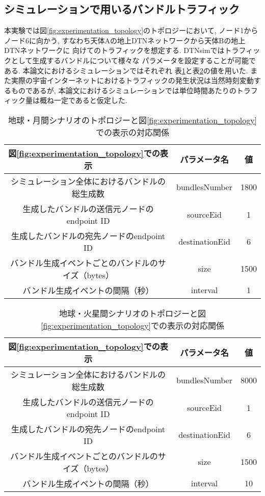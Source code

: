 \subsection{シミュレーションで用いるバンドルトラフィック}
\label{section:シミュレーションで用いるバンドルトラフィック}
本実験では図\ref{fig:experimentation_topology}のトポロジーにおいて, 
ノード1からノード6に向かう, すなわち天体Aの地上DTNネットワークから天体Bの地上DTNネットワークに
向けてのトラフィックを想定する. DTNsimではトラフィックとして生成するバンドルについて様々な
パラメータを設定することが可能である. 本論文におけるシミュレーションではそれぞれ
表\ref{table:traffic_earth_moon}と表\ref{table:traffic_earth_mars}の値を用いた. 
また実際の宇宙インターネットにおけるトラフィックの発生状況は当然時刻変動するものであるが, 
本論文におけるシミュレーションでは単位時間あたりのトラフィック量は概ね一定であると仮定した.

\begin{table}[htbp]
    \centering
    \begin{tabular}{c|c|c}  \hline
        図\ref{fig:experimentation_topology}での表示 & パラメータ名 & 値 \\ \hline\hline
        シミュレーション全体におけるバンドルの総生成数 & bundlesNumber & 1800 \\
        生成したバンドルの送信元ノードのendpoint ID & sourceEid & 1 \\
        生成したバンドルの宛先ノードのendpoint ID & destinationEid & 6 \\
        バンドル生成イベントごとのバンドルのサイズ（bytes）& size & 1500\\
        バンドル生成イベントの間隔（秒）& interval & 1 \\ \hline
    \end{tabular}
    \caption{地球・月間シナリオのトポロジーと図\ref{fig:experimentation_topology}での表示の対応関係}
    \label{table:traffic_earth_moon}
\end{table}

\begin{table}[htbp]
    \centering
    \begin{tabular}{c|c|c}  \hline
        図\ref{fig:experimentation_topology}での表示 & パラメータ名 & 値 \\ \hline\hline
        シミュレーション全体におけるバンドルの総生成数 & bundlesNumber & 8000 \\
        生成したバンドルの送信元ノードのendpoint ID & sourceEid & 1 \\
        生成したバンドルの宛先ノードのendpoint ID & destinationEid & 6 \\
        バンドル生成イベントごとのバンドルのサイズ（bytes）& size & 1500\\
        バンドル生成イベントの間隔（秒）& interval & 10 \\ \hline
    \end{tabular}
    \caption{地球・火星間シナリオのトポロジーと図\ref{fig:experimentation_topology}での表示の対応関係}
    \label{table:traffic_earth_mars}
\end{table}
